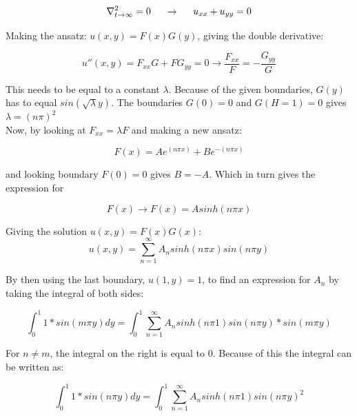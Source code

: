 \documentclass[10pt,a4paper]{article}
\begin{document}
\begin{equation}
\nabla^2_{t\rightarrow \infty}=0 \hspace{0.5cm} \rightarrow \hspace{0.5cm} u_{xx}+u_{yy}=0
\end{equation}

\noindent Making the ansatz: $u(x,y)=F(x)G(y)$, giving the double derivative: 

\begin{equation}
u''(x,y)=F_{xx}G+FG_{yy}=0 \rightarrow \frac{F_{xx}}{F}=-\frac{G_{yy}}{G}
\end{equation}

\noindent This needs to be equal to a constant $\lambda$. Because of the given boundaries, $G(y)$ has to equal $sin(\sqrt{\lambda}y)$. The boundaries $G(0)=0$ and $G(H=1)=0$ gives $\lambda=(n\pi)^2$\\

\noindent Now, by looking at $F_{xx}=\lambda F$ and making a new ansatz: 

\begin{equation}
F(x)=Ae^{(n\pi x)}+Be^{-(n\pi x)}
\end{equation}

\noindent and looking boundary $F(0)=0$ gives $B=-A$. Which in turn gives the expression for 

\begin{equation}
F(x) \rightarrow F(x)=Asinh(n\pi x)
\end{equation}

\noindent Giving the solution $u(x,y)=F(x)G(x)$:\\

\begin{equation}
u(x,y)=\sum^\infty_{n=1}A_nsinh(n\pi x)sin(n\pi y)
\end{equation}

\noindent By then using the last boundary, $u(1,y)=1$, to find an expression for $A_n$ by taking the integral of both sides: 


\begin{equation}
\int_0^1 1*sin(m\pi y) dy = \int_0^1 \sum^\infty_{n=1}A_nsinh(n\pi 1)sin(n\pi y)*sin(m\pi y)
\end{equation}

\noindent For $n\neq m$, the integral on the right is equal to 0. Because of this the integral can be written as:


\begin{equation}
\int_0^1 1*sin(n\pi y) dy = \int_0^1 \sum^\infty_{n=1}A_nsinh(n\pi 1)sin(n\pi y)^2
\end{equation}
\end{document}

